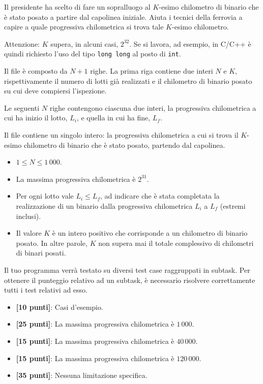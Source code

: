 Il presidente ha scelto di fare un sopralluogo al $K$-esimo chilometro di binario che è stato posato a partire dal capolinea iniziale. Aiuta i tecnici della ferrovia a capire a quale progressiva chilometrica si trova tale $K$-esimo chilometro.

\begin{warning}
    Attenzione: $K$ supera, in alcuni casi, $2^{32}$. Se si lavora, ad esempio, in C/C++ è quindi richiesto l'uso del tipo \texttt{long long} al posto di \texttt{int}.
\end{warning}

\Input
Il file  è composto da $N + 1$ righe. La prima riga contiene due interi $N$ e $K$, rispettivamente il numero di lotti già realizzati e il chilometro di binario posato su cui deve compiersi l'ispezione.

Le seguenti $N$ righe contengono ciascuna due interi, la progressiva chilometrica a cui ha inizio il lotto, $L_i$, e quella in cui ha fine, $L_f$.

\Output
Il file \outputfile{} contiene un singolo intero: la progressiva chilometrica a cui si trova il $K$-esimo chilometro di binario che è stato posato, partendo dal capolinea.

\Constraints
\begin{itemize}[nolistsep, itemsep=2mm]
\item $1 \le N \le 1\,000$.
\item La massima progressiva chilometrica è $2^{31}$.
\item Per ogni lotto vale $L_i \le L_f$, ad indicare che è stata completata la realizzazione di un binario dalla progressiva chilometrica $L_i$ a $L_f$ (estremi inclusi).
\item Il valore $K$ è un intero positivo che corrisponde a un chilometro di binario posato. In altre parole, $K$ non supera mai il totale complessivo di chilometri di binari posati.
\end{itemize}

\pagebreak

\Scoring
Il tuo programma verrà testato su diversi test case raggruppati in subtask.
Per ottenere il punteggio relativo ad un subtask, è necessario risolvere
correttamente tutti i test relativi ad esso.
\begin{itemize}[nolistsep,itemsep=2mm]
\item \textbf{ [10 punti]}: Casi d'esempio.
\item \textbf{ [25 punti]}: La massima progressiva chilometrica è $1\,000$.
\item \textbf{ [15 punti]}: La massima progressiva chilometrica è $40\,000$.
\item \textbf{ [15 punti]}: La massima progressiva chilometrica è $120\,000$.
\item \textbf{ [35 punti]}: Nessuna limitazione specifica.
\end{itemize}

